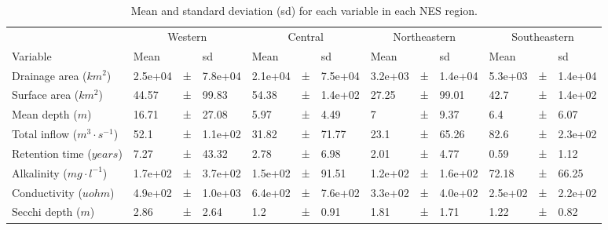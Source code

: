 \documentclass[journal abbreviations, manuscript]{copernicus}
\providecommand{\DIFaddbeginFL}{} %
\providecommand{\DIFaddendFL}{} %
\providecommand{\DIFdelbeginFL}{} %
\providecommand{\DIFdelendFL}{} %
\begin{document}
\begin{table}[t]
\caption{Mean and standard deviation (sd) for each variable in each NES region.}\label{table:means}
\begin{tabular}{lllllllllllll}
\tophline
\DIFdelbeginFL %
\DIFdelendFL \DIFaddbeginFL \multicolumn{1}{l}{Region} \DIFaddendFL & \DIFdelbeginFL %
\DIFdelendFL \DIFaddbeginFL \multicolumn{3}{c}{Western} \DIFaddendFL & \DIFdelbeginFL %
\DIFdelendFL \DIFaddbeginFL \multicolumn{3}{c}{Central} \DIFaddendFL & \DIFdelbeginFL %
\DIFdelendFL \DIFaddbeginFL \multicolumn{3}{c}{Northeastern} \DIFaddendFL & \DIFdelbeginFL %
\DIFdelendFL \DIFaddbeginFL \multicolumn{3}{c}{Southeastern} \DIFaddendFL \\ \cline{1-1} \cline{2-4} \cline{5-7} \cline{8-10} \cline{11-13}
Variable & Mean &   & sd & Mean &   & sd & Mean &   & sd & Mean &   & sd\\
\middlehline
Drainage area ($km^{2}$) & 2.5e+04 & ± & 7.8e+04 & 2.1e+04 & ± & 7.5e+04 & 3.2e+03 & ± & 1.4e+04 & 5.3e+03 & ± & 1.4e+04\\

Surface area ($km^{2}$) & 44.57 & ± & 99.83 & 54.38 & ± & 1.4e+02 & 27.25 & ± & 99.01 & 42.7 & ± & 1.4e+02\\

Mean depth ($m$) & 16.71 & ± & 27.08 & 5.97 & ± & 4.49 & 7 & ± & 9.37 & 6.4 & ± & 6.07\\

Total inflow ($m^{3} \cdot s^{-1}$) & 52.1 & ± & 1.1e+02 & 31.82 & ± & 71.77 & 23.1 & ± & 65.26 & 82.6 & ± & 2.3e+02\\

Retention time ($years$) & 7.27 & ± & 43.32 & 2.78 & ± & 6.98 & 2.01 & ± & 4.77 & 0.59 & ± & 1.12\\

Alkalinity ($mg \cdot l^{-1}$) & 1.7e+02 & ± & 3.7e+02 & 1.5e+02 & ± & 91.51 & 1.2e+02 & ± & 1.6e+02 & 72.18 & ± & 66.25\\

Conductivity ($uohm$) & 4.9e+02 & ± & 1.0e+03 & 6.4e+02 & ± & 7.6e+02 & 3.3e+02 & ± & 4.0e+02 & 2.5e+02 & ± & 2.2e+02\\

Secchi depth ($m$) & 2.86 & ± & 2.64 & 1.2 & ± & 0.91 & 1.81 & ± & 1.71 & 1.22 & ± & 0.82\\


\end{tabular}
\end{table}
\end{document}
